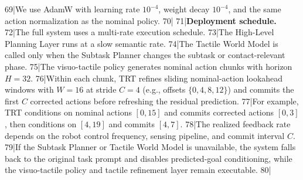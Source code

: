 69|We use AdamW with learning rate $10^{-4}$, weight decay $10^{-4}$, and the same action normalization as the nominal policy.
70|
71|\noindent\textbf{Deployment schedule.}
72|The full system uses a multi-rate execution schedule.
73|The High-Level Planning Layer runs at a slow semantic rate.
74|The Tactile World Model is called only when the Subtask Planner changes the subtask or contact-relevant phase.
75|The visuo-tactile policy generates nominal action chunks with horizon $H=32$.
76|Within each chunk, TRT refines sliding nominal-action lookahead windows with $W=16$ at stride $C=4$ (e.g., offsets $\{0,4,8,12\}$) and commits the first $C$ corrected actions before refreshing the residual prediction.
77|For example, TRT conditions on nominal actions $[0,15]$ and commits corrected actions $[0,3]$, then conditions on $[4,19]$ and commits $[4,7]$.
78|The realized feedback rate depends on the robot control frequency, sensing pipeline, and commit interval $C$.
79|If the Subtask Planner or Tactile World Model is unavailable, the system falls back to the original task prompt and disables predicted-goal conditioning, while the visuo-tactile policy and tactile refinement layer remain executable.
80|
